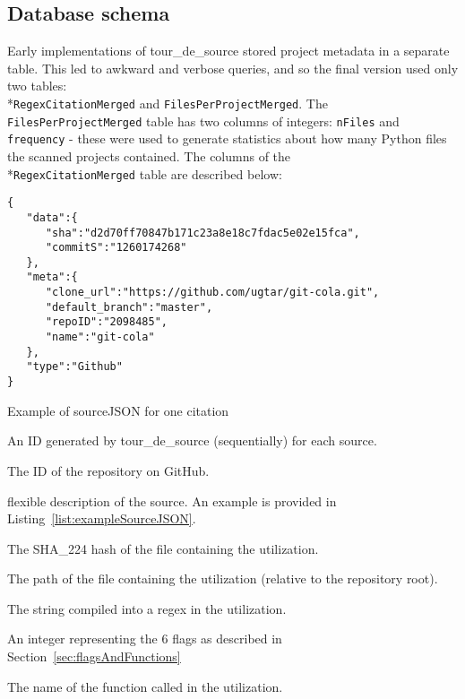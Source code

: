 \subsection*{Database schema}
Early implementations of tour\_de\_source stored project metadata in a separate table.  This led to awkward and verbose queries, and so the final version used only two tables: \\*{\tt RegexCitationMerged} and {\tt FilesPerProjectMerged}.  The {\tt FilesPerProjectMerged} table has two columns of integers: {\tt nFiles} and {\tt frequency} - these were used to generate statistics about how many Python files the scanned projects contained.  The columns of the \\*{\tt RegexCitationMerged} table are described below:


\begin{listing}[tb]
\begin{verbatim}
{
   "data":{
      "sha":"d2d70ff70847b171c23a8e18c7fdac5e02e15fca",
      "commitS":"1260174268"
   },
   "meta":{
      "clone_url":"https://github.com/ugtar/git-cola.git",
      "default_branch":"master",
      "repoID":"2098485",
      "name":"git-cola"
   },
   "type":"Github"
}
\end{verbatim}
\caption{Example of sourceJSON for one citation}
\label{list:exampleSourceJSON}
\end{listing}

\begin{description} \itemsep -1pt
\item[uniqueSourceID] An ID generated by tour\_de\_source (sequentially) for each source.
\item[repoID] The ID of the repository on GitHub.
\item[sourceJSON] flexible description of the source.  An example is provided in Listing~\ref{list:exampleSourceJSON}.
\item[fileHash] The SHA\_224 hash of the file containing the utilization.
\item[filePath] The path of the file containing the utilization (relative to the repository root).
\item[pattern] The string compiled into a regex in the utilization.
\item[flags] An integer representing the 6 flags as described in Section~\ref{sec:flagsAndFunctions}
\item[regexFunction] The name of the function called in the utilization.
\end{description}

